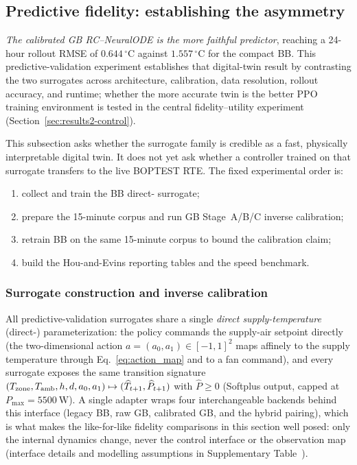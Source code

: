 \subsection{Predictive fidelity: establishing the asymmetry}
\label{sec:results1-digital-twin}

\emph{The calibrated GB RC--NeuralODE is the more faithful predictor}, reaching a 24-hour rollout RMSE of $0.644\,^\circ$C against $1.557\,^\circ$C for the compact BB. This predictive-validation experiment establishes that digital-twin result by contrasting the two surrogates across architecture, calibration, data resolution, rollout accuracy, and runtime; whether the more accurate twin is the better PPO training environment is tested in the central fidelity--utility experiment (Section~\ref{sec:results2-control}).


\label{ssec:block1-scope}

This subsection asks whether the surrogate family is credible as a fast, physically interpretable digital twin. It does not yet ask whether a controller trained on that surrogate transfers to the live BOPTEST RTE. The fixed experimental order is:
\begin{enumerate}
 \item collect and train the BB direct-\Tsupply{} surrogate;
 \item prepare the 15-minute corpus and run GB Stage~A/B/C inverse calibration;
 \item retrain BB on the same 15-minute corpus to bound the calibration claim;
 \item build the Hou-and-Evins reporting tables and the speed benchmark.
\end{enumerate}



\subsubsection{Surrogate construction and inverse calibration}
\label{ssec:block1-direct-tsup}

All predictive-validation surrogates share a single \emph{direct supply-temperature} (direct-\Tsupply{}) parameterization: the policy commands the supply-air setpoint directly (the two-dimensional action \(a=(a_0,a_1)\in[-1,1]^2\) maps affinely to the supply temperature through Eq.~\eqref{eq:action_map} and to a fan command), and every surrogate exposes the same transition signature \((T_{\mathrm{zone}},T_{\mathrm{amb}},h,d,a_0,a_1)\mapsto(\widehat{T}_{t+1},\widehat{P}_{t+1})\) with \(\widehat{P}\ge 0\) (Softplus output, capped at \(P_{\max}=5500~\mathrm{W}\)). A single adapter wraps four interchangeable backends behind this interface (legacy BB, raw GB, calibrated GB, and the hybrid pairing), which is what makes the like-for-like fidelity comparisons in this section well posed: only the internal dynamics change, never the control interface or the observation map (interface details and modelling assumptions in Supplementary Table~).


